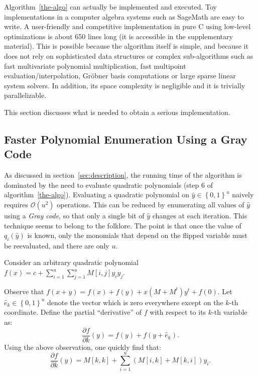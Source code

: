 \documentclass[twoside,leqno]{article}
\newcommand{\bits}{\left\{0, 1\right\}}
\newcommand{\bigO}[1]{\ensuremath{\mathcal{O}\left( #1 \right)} }
\begin{document}
Algorithm~\ref{the-algo} can actually be implemented and executed. Toy
implementations in a computer algebra systems such as \textsf{SageMath} are easy
to write. A user-friendly and competitive implementation in pure C using
low-level optimizations is about 650 lines long (it is accessible in the
supplementary material). This is possible because the algorithm itself is
simple, and because it does not rely on sophisticated data structures or complex
sub-algorithms such as fast multivariate polynomial multiplication, fast
multipoint evaluation/interpolation, Gröbner basis computations or large sparse
linear system solvers. In addition, its space complexity is negligible and it is
trivially parallelizable.

This section discusses what is needed to obtain a serious implementation.

\subsection{Faster Polynomial Enumeration Using a Gray Code}
\label{sec:gray}

As discussed in section~\ref{sec:description}, the running time of the algorithm
is dominated by the need to evaluate quadratic polynomials (step 6 of
algorithm~\ref{the-algo}). Evaluating a quadratic polynomial on
$\hat y \in \bits^u$ naively requires $\bigO{u^2}$ operations. This can be
reduced by enumerating all values of $\hat y$ using a \emph{Gray code}, so that only a
single bit of $\hat y$ changes at each iteration. This technique seems to belong
to the folklore. The point is that once the value of $q_i(\hat y)$ is known,
only the monomials that depend on the flipped variable must be reevaluated, and
there are only $u$.

Consider an arbitrary quadratic polynomial $\displaystyle f(x) = c + \sum_{i=1}^u \sum_{j=1}^u M[i,j] y_i y_j$.

Observe that $f(x + y) = f(x) + f(y) + x \left(M + M^t\right)y^t + f(0)$. Let
$\hat e_k \in \bits^u$ denote the vector which is zero everywhere except on the
$k$-th coordinate.  Define the partial ``derivative'' of $f$ with respect to its
$k$-th variable as:
\[
\frac{\partial f}{\partial k}(y) = f(y) + f(y + \hat e_k).
\]
Using the above observation, one quickly find that:
\[
\frac{\partial f}{\partial k}(y) = M[k,k] + \sum_{i=1}^u (M[i,k] + M[k, i]) y_i.
\]
\end{document}
